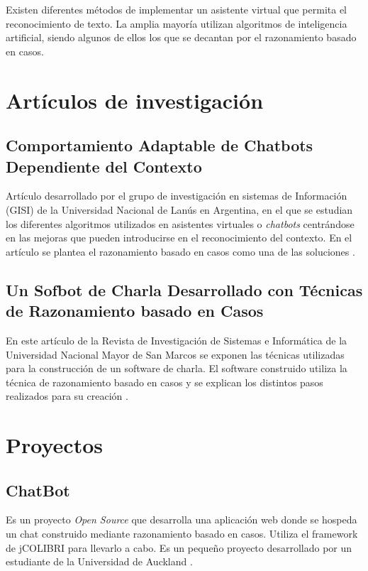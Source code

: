 
Existen diferentes métodos de implementar un asistente virtual que permita el reconocimiento de texto. La amplia mayoría utilizan algoritmos de inteligencia artificial, siendo algunos de ellos los que se decantan por el razonamiento basado en casos.

\section{Artículos de investigación}

\subsection{Comportamiento Adaptable de Chatbots Dependiente del Contexto}

Artículo desarrollado por el grupo de investigación en sistemas de
Información (GISI) de la Universidad Nacional de Lanús en Argentina, en el que se estudian los diferentes algoritmos utilizados en asistentes virtuales o \emph{chatbots} centrándose en las mejoras que pueden introducirse en el reconocimiento del contexto. En el artículo se plantea el razonamiento basado en casos como una de las soluciones \cite{rev:invest}.

\subsection{Un Sofbot de Charla Desarrollado con Técnicas de Razonamiento basado en Casos}

En este artículo de la Revista de Investigación de Sistemas e Informática de la Universidad Nacional Mayor de San Marcos se exponen las técnicas utilizadas para la construcción de un software de charla. El software construido utiliza la técnica de razonamiento basado en casos y se explican los distintos pasos realizados para su creación \cite{SAMI:project}.


\section{Proyectos}

\subsection{ChatBot}

Es un proyecto \emph{Open Source} que desarrolla una aplicación web donde se hospeda un chat construido mediante razonamiento basado en casos. Utiliza el framework de jCOLIBRI para llevarlo a cabo. Es un pequeño proyecto desarrollado por un estudiante de la Universidad de Auckland \cite{ChatBot:project}.

